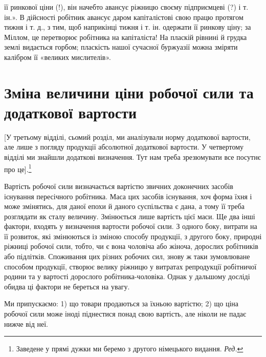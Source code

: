 \parcont{}  %
її ринкової ціни (!), він начебто авансує ріжницю своєму підприємцеві
(?) і т. ін.». В дійсності робітник авансує даром
капіталістові свою працю протягом тижня і т. д., з тим, щоб
наприкінці тижня і т. ін. одержати її ринкову ціну; за Міллом,
це перетворює робітника на капіталіста! На пласкій рівнині
й грудка землі видається горбом; пласкість нашої сучасної буржуазії
можна зміряти калібром її «великих мислителів».

\section{Зміна величини ціни робочої сили та додаткової
вартости}

[У третьому відділі, сьомий розділ, ми аналізували норму
додаткової вартости, але лише з погляду продукції абсолютної
додаткової вартости. У четвертому відділі ми знайшли додаткові
визначення. Тут нам треба зрезюмувати все посутнє про це].\footnote*{
Заведене у прямі дужки ми беремо з другого німецького видання.
\emph{Ред.}
}

Вартість робочої сили визначається вартістю звичних доконечних
засобів існування пересічного робітника. Маса цих засобів
існування, хоч форма їхня і може змінятись, для даної епохи
й даного суспільства є дана, а тому її треба розглядати як сталу
величину. Змінюється лише вартість цієї маси. Ще два інші
фактори, входять у визначення вартости робочої сили. З одного
боку, витрати на її розвиток, які змінюються із зміною способу
продукції, з другого боку, природні ріжниці робочої сили, тобто,
чи є вона чоловіча або жіноча, дорослих робітників або підлітків.
Споживання цих різних робочих сил, знову ж таки зумовлюване
способом продукції, створює велику ріжницю у витратах репродукції
робітничої родини та у вартості дорослого робітника-чоловіка.
Однак у дальшому досліді обидва ці фактори не береться
на увагу.

Ми припускаємо: 1) що товари продаються за їхньою вартістю;
2) що ціна робочої сили може іноді піднестися понад свою вартість,
але ніколи не падає нижче від неї.

